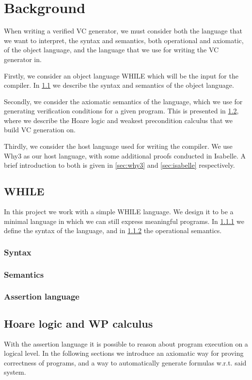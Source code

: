\section{Background}
When writing a verified VC generator, we must consider both the language that we want to interpret, the syntax and semantics, both operational and axiomatic, of the object language, and the language that we use for writing the VC generator in.

Firstly, we consider an object language WHILE which will be the input for the compiler.
In \ref{sec:while} we describe the syntax and semantics of the object language.

Secondly, we consider the axiomatic semantics of the language, which we use for generating verification conditions for a given program. This is presented in \ref{sec:hoarewp}, where we describe the Hoare logic and weakest precondition calculus that we build VC generation on.

Thirdly, we consider the host language used for writing the compiler.
We use Why3 as our host language, with some additional proofs conducted in Isabelle. A brief introduction to both is given in \ref{sec:why3} and \ref{sec:isabelle} respectively.

\subsection{WHILE}\label{sec:while}
In this project we work with a simple WHILE language. We design it to be a minimal language in which we can still express meaningful programs.
In \ref{sec:syntax} we define the syntax of the language, and in \ref{sec:semantics} the operational semantics.

\subsubsection{Syntax}\label{sec:syntax}

\subsubsection{Semantics}\label{sec:semantics}


\subsubsection{Assertion language}\label{sec:assert}


\subsection{Hoare logic and WP calculus}\label{sec:hoarewp}
With the assertion language it is possible to reason about program execution on a logical level.
In the following sections we introduce an axiomatic way for proving correctness of programs, and a way to
automatically generate formulas w.r.t. said system.

